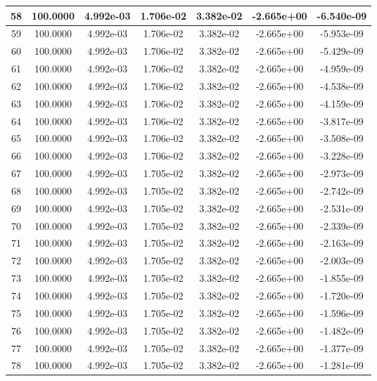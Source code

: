 \documentclass[10pt]{report}
\begin{document}
\begin{table}[H]
\begin{center}
\begin{tabular}{|c|c|c|c|c|c|c|}
58 & 100.0000 & 4.992e-03 & 1.706e-02 & 3.382e-02 & -2.665e+00 & -6.540e-09\\ \hline
59 & 100.0000 & 4.992e-03 & 1.706e-02 & 3.382e-02 & -2.665e+00 & -5.953e-09\\ \hline
60 & 100.0000 & 4.992e-03 & 1.706e-02 & 3.382e-02 & -2.665e+00 & -5.429e-09\\ \hline
61 & 100.0000 & 4.992e-03 & 1.706e-02 & 3.382e-02 & -2.665e+00 & -4.959e-09\\ \hline
62 & 100.0000 & 4.992e-03 & 1.706e-02 & 3.382e-02 & -2.665e+00 & -4.538e-09\\ \hline
63 & 100.0000 & 4.992e-03 & 1.706e-02 & 3.382e-02 & -2.665e+00 & -4.159e-09\\ \hline
64 & 100.0000 & 4.992e-03 & 1.706e-02 & 3.382e-02 & -2.665e+00 & -3.817e-09\\ \hline
65 & 100.0000 & 4.992e-03 & 1.706e-02 & 3.382e-02 & -2.665e+00 & -3.508e-09\\ \hline
66 & 100.0000 & 4.992e-03 & 1.706e-02 & 3.382e-02 & -2.665e+00 & -3.228e-09\\ \hline
67 & 100.0000 & 4.992e-03 & 1.705e-02 & 3.382e-02 & -2.665e+00 & -2.973e-09\\ \hline
68 & 100.0000 & 4.992e-03 & 1.705e-02 & 3.382e-02 & -2.665e+00 & -2.742e-09\\ \hline
69 & 100.0000 & 4.992e-03 & 1.705e-02 & 3.382e-02 & -2.665e+00 & -2.531e-09\\ \hline
70 & 100.0000 & 4.992e-03 & 1.705e-02 & 3.382e-02 & -2.665e+00 & -2.339e-09\\ \hline
71 & 100.0000 & 4.992e-03 & 1.705e-02 & 3.382e-02 & -2.665e+00 & -2.163e-09\\ \hline
72 & 100.0000 & 4.992e-03 & 1.705e-02 & 3.382e-02 & -2.665e+00 & -2.003e-09\\ \hline
73 & 100.0000 & 4.992e-03 & 1.705e-02 & 3.382e-02 & -2.665e+00 & -1.855e-09\\ \hline
74 & 100.0000 & 4.992e-03 & 1.705e-02 & 3.382e-02 & -2.665e+00 & -1.720e-09\\ \hline
75 & 100.0000 & 4.992e-03 & 1.705e-02 & 3.382e-02 & -2.665e+00 & -1.596e-09\\ \hline
76 & 100.0000 & 4.992e-03 & 1.705e-02 & 3.382e-02 & -2.665e+00 & -1.482e-09\\ \hline
77 & 100.0000 & 4.992e-03 & 1.705e-02 & 3.382e-02 & -2.665e+00 & -1.377e-09\\ \hline
78 & 100.0000 & 4.992e-03 & 1.705e-02 & 3.382e-02 & -2.665e+00 & -1.281e-09\\ \hline

\end{tabular}
\end{center}
\end{table}
\end{document}

